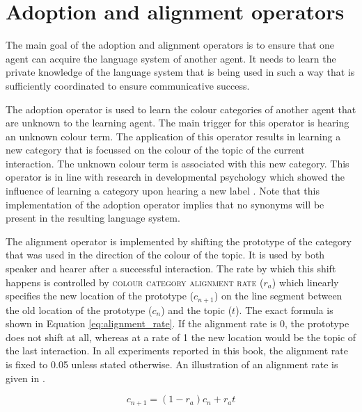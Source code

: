 \section{Adoption and alignment operators}
\label{s:bcs-adoption-alignment-operators}

The main goal of the adoption and alignment operators is to ensure
that one agent can acquire the language system of another agent. It
needs to learn the private knowledge of the language system that is
being used in such a way that is sufficiently coordinated to ensure
communicative success.

The adoption operator
is used to learn the colour categories of
another agent that are unknown to the learning agent. The main trigger
for this operator is hearing an unknown colour term. The application
of this operator results in learning a new category that is focussed
on the colour of the topic of the current interaction. The unknown
colour term is associated with this new category. This operator is in
line with research in developmental psychology which showed the
influence of learning a category upon hearing a new label
\citep{xu02role}. Note that this implementation of the adoption
operator implies that no synonyms will be present in the resulting
language system.

The alignment operator is implemented by shifting the prototype of
the category that was used in the direction of the colour of the
topic. It is used by both speaker and hearer after a successful
interaction. The rate by which this shift happens is controlled by
\textsc{colour category alignment rate} 
($r_a$) which linearly specifies the new
location of the prototype ($c_{n+1}$) on the line segment between the
old location of the prototype ($c_n$) and the topic ($t$). The exact
formula is shown in Equation \ref{eq:alignment_rate}. If the alignment
rate is 0, the prototype does not shift at all, whereas at a rate of
1 the new location would be the topic of the last interaction. In all
experiments reported in this book, the alignment rate is fixed to
0.05 unless stated otherwise. An illustration of an alignment rate is
given in .

\begin{equation}
c_{n+1} = (1 - r_a) c_n  + r_a t
\label{eq:alignment_rate}
\end{equation}

